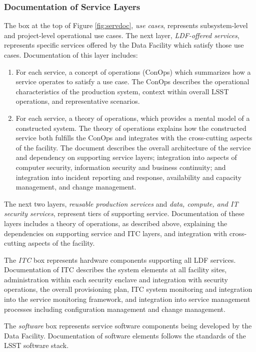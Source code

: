 \subsubsection{Documentation of Service Layers}

The box at the top of Figure \ref{fig:servdoc}, \textit{use cases}, represents subsystem-level and project-level operational use cases. The next layer, \textit{LDF-offered services}, represents specific services offered by the Data Facility which satisfy those use cases. Documentation of this layer includes:

\begin{enumerate}
\item	For each service, a concept of operations (ConOps) which summarizes how a service operates to satisfy a use case. The ConOps describes the operational characteristics of the production system, context within overall LSST operations, and representative scenarios. 
\item	For each service, a theory of operations, which provides a mental model of a constructed system. The theory of operations explains how the constructed service both fulfills the ConOps and integrates with the cross-cutting aspects of the facility. The document describes the overall architecture of the service and dependency on supporting service layers; integration into aspects of computer security, information security and business continuity; and integration into incident reporting and response, availability and capacity management, and change management.
\end{enumerate}

The next two layers, \textit{reusable production services} and \textit{data, compute, and IT security services}, represent tiers of supporting service. Documentation of these layers includes a theory of operations, as described above, explaining the dependencies on supporting service and ITC layers, and integration with cross-cutting aspects of the facility.

The \textit{ITC} box represents hardware components supporting all LDF services. Documentation of ITC describes the system elements at all facility sites, administration within each security enclave and integration with security operations, the overall provisioning plan, ITC system monitoring and integration into the service monitoring framework, and integration into service management processes including configuration management and change management.

The \textit{software} box represents service software components being developed by the Data Facility.
Documentation of software elements follows the standards of the LSST software stack.

